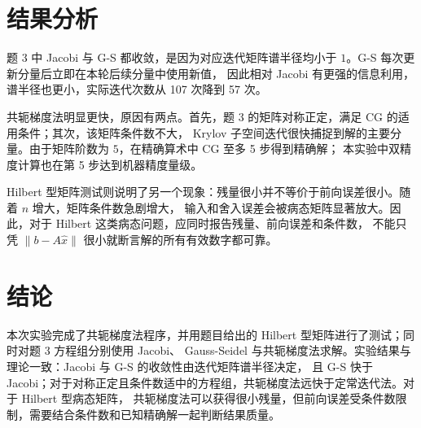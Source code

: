 \documentclass[a4paper,11pt]{article}
\begin{document}
\section{结果分析}
题 3 中 Jacobi 与 G-S 都收敛，是因为对应迭代矩阵谱半径均小于 $1$。G-S 每次更新分量后立即在本轮后续分量中使用新值，
因此相对 Jacobi 有更强的信息利用，谱半径也更小，实际迭代次数从 107 次降到 57 次。

共轭梯度法明显更快，原因有两点。首先，题 3 的矩阵对称正定，满足 CG 的适用条件；其次，该矩阵条件数不大，
Krylov 子空间迭代很快捕捉到解的主要分量。由于矩阵阶数为 $5$，在精确算术中 CG 至多 5 步得到精确解；
本实验中双精度计算也在第 5 步达到机器精度量级。

Hilbert 型矩阵测试则说明了另一个现象：残量很小并不等价于前向误差很小。随着 $n$ 增大，矩阵条件数急剧增大，
输入和舍入误差会被病态矩阵显著放大。因此，对于 Hilbert 这类病态问题，应同时报告残量、前向误差和条件数，
不能只凭 $\|b-A\hat x\|$ 很小就断言解的所有有效数字都可靠。

\section{结论}
本次实验完成了共轭梯度法程序，并用题目给出的 Hilbert 型矩阵进行了测试；同时对题 3 方程组分别使用 Jacobi、
Gauss-Seidel 与共轭梯度法求解。实验结果与理论一致：Jacobi 与 G-S 的收敛性由迭代矩阵谱半径决定，
且 G-S 快于 Jacobi；对于对称正定且条件数适中的方程组，共轭梯度法远快于定常迭代法。对于 Hilbert 型病态矩阵，
共轭梯度法可以获得很小残量，但前向误差受条件数限制，需要结合条件数和已知精确解一起判断结果质量。
\end{document}
